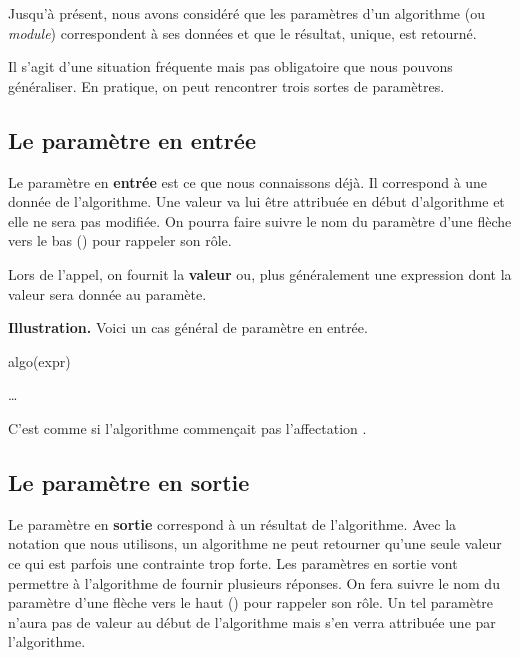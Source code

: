 	Jusqu'à présent,
	nous avons considéré que les paramètres d'un algorithme (ou \emph{module})
	correspondent à ses données et que le résultat, unique,
	est retourné.

	Il s'agit d'une situation fréquente mais pas obligatoire
	que nous pouvons généraliser.
	En pratique, on peut rencontrer trois sortes de paramètres.

	\subsection{Le paramètre en entrée}

		Le paramètre en \textbf{entrée}
		est ce que nous connaissons déjà.
		Il correspond à une donnée de l'algorithme.
		Une valeur va lui être attribuée en début d'algorithme
		et elle ne sera pas modifiée.
		On pourra faire suivre le nom du paramètre d'une flèche
		vers le bas (\In) pour rappeler son rôle.
		
		Lors de l'appel, on fournit la \textbf{valeur}
		ou, plus généralement une expression
		dont la valeur sera donnée au paramète.

		\textbf{Illustration.} 
		Voici un cas général de paramètre en entrée.
		
		\begin{minipage}{4cm}
			\begin{LDA}
				\Stmt algo(expr)
				\Empty
			\end{LDA}
		\end{minipage}
		\quad
		\begin{minipage}{8cm}
			\begin{LDA}
				\LComment {Code appelé}
				\Entete{monAlgo}{\Par{par\In}{entier}}{}
				\Stmt \dots
			\end{LDA}
		\end{minipage}
		
		C'est comme si l'algorithme 
		commençait pas l'affectation
		.
		
	\subsection{Le paramètre en sortie}

		Le paramètre en \textbf{sortie}
		correspond à un résultat de l'algorithme.
		Avec la notation que nous utilisons,
		un algorithme ne peut retourner qu'une seule valeur
		ce qui est parfois une contrainte trop forte.
		Les paramètres en sortie vont permettre à l'algorithme
		de fournir plusieurs réponses.
		On fera suivre le nom du paramètre d'une flèche
		vers le haut (\Out) pour rappeler son rôle.
		Un tel paramètre n'aura pas de valeur
		au début de l'algorithme mais s'en verra attribuée une
		par l'algorithme.
		
